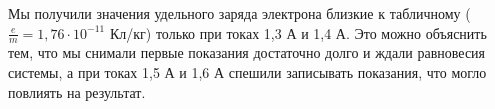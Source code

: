 \documentclass[a4paper, 12pt]{article}%
\begin{document}
	Мы получили значения удельного заряда электрона близкие к табличному ($\frac{e}{m} = 1,76 \cdot 10^{-11}$ Кл/кг) только при токах 1,3 А и 1,4 А. Это можно объяснить тем, что мы снимали первые показания достаточно долго и ждали равновесия системы, а при токах 1,5 А и 1,6 А спешили записывать показания, что могло повлиять на результат.
	
	
	
	
	
	
	
	
	
	
	
	
\end{document}
